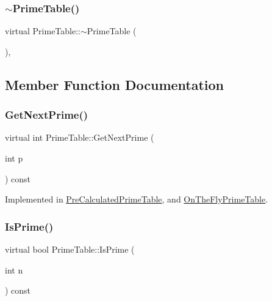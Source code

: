 \subsubsection{\texorpdfstring{$\sim$\+Prime\+Table()}{~PrimeTable()}}
{\footnotesize\ttfamily virtual Prime\+Table\+::$\sim$\+Prime\+Table (\begin{DoxyParamCaption}{ }\end{DoxyParamCaption})\hspace{0.3cm}{\ttfamily [inline]}, {\ttfamily [virtual]}}



\subsection{Member Function Documentation}
\mbox{\label{class_prime_table_ae537c939f56617d8937d57bbbae3ab30}} 
\subsubsection{\texorpdfstring{Get\+Next\+Prime()}{GetNextPrime()}}
{\footnotesize\ttfamily virtual int Prime\+Table\+::\+Get\+Next\+Prime (\begin{DoxyParamCaption}\item[{int}]{p }\end{DoxyParamCaption}) const\hspace{0.3cm}{\ttfamily [pure virtual]}}



Implemented in \hyperlink{class_pre_calculated_prime_table_a0ff10b1fe13df7e56b8d7ed9f41d3998}{Pre\+Calculated\+Prime\+Table}, and \hyperlink{class_on_the_fly_prime_table_a5a4644fedd95d33136723f33b9302bfc}{On\+The\+Fly\+Prime\+Table}.

\mbox{\label{class_prime_table_a2ab9243364ded0c51541f641b2df362a}} 
\subsubsection{\texorpdfstring{Is\+Prime()}{IsPrime()}}
{\footnotesize\ttfamily virtual bool Prime\+Table\+::\+Is\+Prime (\begin{DoxyParamCaption}\item[{int}]{n }\end{DoxyParamCaption}) const\hspace{0.3cm}{\ttfamily [pure virtual]}}



